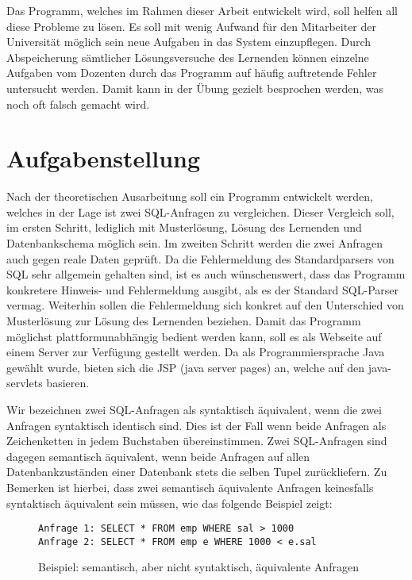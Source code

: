Das Programm, welches im Rahmen dieser Arbeit entwickelt wird, soll helfen all diese Probleme zu lösen. Es soll mit wenig Aufwand für den Mitarbeiter der Universität möglich sein neue Aufgaben in das System einzupflegen. Durch Abspeicherung sämtlicher Lösungsversuche des Lernenden können einzelne Aufgaben vom Dozenten durch das Programm auf häufig auftretende Fehler untersucht werden. Damit kann in der Übung gezielt besprochen werden, was noch oft falsch gemacht wird.

\section{Aufgabenstellung}

Nach der theoretischen Ausarbeitung soll ein Programm entwickelt werden, welches in der Lage ist zwei SQL-Anfragen zu vergleichen. Dieser Vergleich soll, im ersten Schritt, lediglich mit Musterlösung, Lösung des Lernenden und Datenbankschema möglich sein. Im zweiten Schritt werden die zwei Anfragen auch gegen reale Daten geprüft. Da die Fehlermeldung des Standardparsers von SQL sehr allgemein gehalten sind, ist es auch wünschenswert, dass das Programm konkretere Hinweis- und Fehlermeldung ausgibt, als es der Standard SQL-Parser vermag. Weiterhin sollen die Fehlermeldung sich konkret auf den Unterschied von Musterlösung zur Lösung des Lernenden beziehen. Damit das Programm möglichst plattformunabhängig bedient werden kann, soll es als Webseite auf einem Server zur Verfügung gestellt werden. Da als Programmiersprache Java gewählt wurde, bieten sich die JSP (java server pages) an, welche auf den java-servlets basieren.

Wir bezeichnen zwei SQL-Anfragen als syntaktisch äquivalent, wenn die zwei Anfragen syntaktisch identisch sind. Dies ist der Fall wenn beide Anfragen als Zeichenketten in jedem Buchstaben übereinstimmen. Zwei SQL-Anfragen sind dagegen semantisch äquivalent, wenn beide Anfragen auf allen Datenbankzuständen einer Datenbank stets die selben Tupel zurückliefern. Zu Bemerken ist hierbei, dass zwei semantisch äquivalente Anfragen keinesfalls syntaktisch äquivalent sein müssen, wie das folgende Beispiel zeigt:

\begin{figure}
\begin{verbatim}
Anfrage 1: SELECT * FROM emp WHERE sal > 1000
Anfrage 2: SELECT * FROM emp e WHERE 1000 < e.sal
\end{verbatim}
\caption{Beispiel: semantisch, aber nicht syntaktisch, äquivalente Anfragen}
\end{figure}

